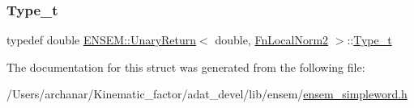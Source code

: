 \mbox{\label{structENSEM_1_1UnaryReturn_3_01double_00_01FnLocalNorm2_01_4_aeffdb3ddbb9a4422627961295ff3ee26}} 
\subsubsection{\texorpdfstring{Type\_t}{Type\_t}\hspace{0.1cm}{\footnotesize\ttfamily [2/2]}}
{\footnotesize\ttfamily typedef double \mbox{\hyperlink{structENSEM_1_1UnaryReturn}{E\+N\+S\+E\+M\+::\+Unary\+Return}}$<$ double, \mbox{\hyperlink{structENSEM_1_1FnLocalNorm2}{Fn\+Local\+Norm2}} $>$\+::\mbox{\hyperlink{structENSEM_1_1UnaryReturn_3_01double_00_01FnLocalNorm2_01_4_aeffdb3ddbb9a4422627961295ff3ee26}{Type\+\_\+t}}}



The documentation for this struct was generated from the following file\+:\begin{DoxyCompactItemize}
\item 
/\+Users/archanar/\+Kinematic\+\_\+factor/adat\+\_\+devel/lib/ensem/\mbox{\hyperlink{lib_2ensem_2ensem__simpleword_8h}{ensem\+\_\+simpleword.\+h}}\end{DoxyCompactItemize}
